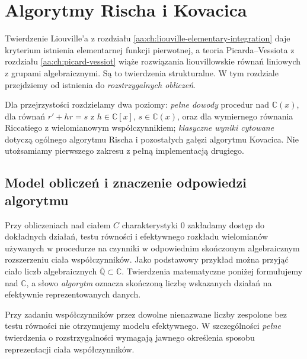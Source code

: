 \chapter{Algorytmy Rischa i Kovacica}
\label{aa:ch:risch-kovacic}

Twierdzenie Liouville'a z rozdziału
\ref{aa:ch:liouville-elementary-integration}
daje kryterium istnienia elementarnej funkcji pierwotnej,
a teoria Picarda--Vessiota z rozdziału
\ref{aa:ch:picard-vessiot}
wiąże rozwiązania liouvillowskie równań liniowych
z grupami algebraicznymi. Są to twierdzenia
strukturalne. W tym rozdziale przejdziemy
od istnienia do \emph{rozstrzygalnych obliczeń}.

Dla przejrzystości rozdzielamy dwa poziomy:
\emph{pełne dowody} procedur nad
$\mathbb C(x)$, dla równań $r'+hr=s$
z $h\in\mathbb C[x]$, $s\in\mathbb C(x)$,
oraz dla wymiernego równania Riccatiego
z wielomianowym współczynnikiem;
\emph{klasyczne wyniki cytowane}
dotyczą ogólnego algorytmu Rischa
i pozostałych gałęzi algorytmu Kovacica.
Nie utożsamiamy pierwszego zakresu
z pełną implementacją drugiego.

\section{Model obliczeń i znaczenie odpowiedzi algorytmu}

\begin{definicja}
\label{aa:def:effective-constants}
Przy obliczeniach nad ciałem $C$ charakterystyki
$0$ zakładamy dostęp do dokładnych działań,
testu równości i efektywnego rozkładu
wielomianów używanych w procedurze
na czynniki w odpowiednim skończonym
algebraicznym rozszerzeniu ciała współczynników.
Jako podstawowy przykład można przyjąć
ciało liczb algebraicznych
$\overline{\mathbb Q}\subset\mathbb C$.
Twierdzenia matematyczne poniżej formułujemy
nad $\mathbb C$, a słowo \emph{algorytm}
oznacza skończoną liczbę wskazanych działań
na efektywnie reprezentowanych danych.
\end{definicja}

Przy zadaniu współczynników przez dowolne
nienazwane liczby zespolone bez testu równości
nie otrzymujemy modelu efektywnego.
W szczególności \emph{pełne}
twierdzenia o rozstrzygalności wymagają
jawnego określenia sposobu reprezentacji
ciała współczynników.

